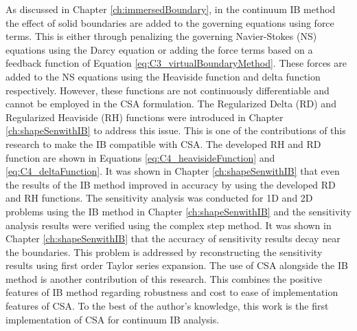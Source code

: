 As discussed in Chapter \ref{ch:immersedBoundary}, in the continuum IB method the effect of solid boundaries are added to the governing equations using force terms. This is either through penalizing the governing Navier-Stokes (NS) equations using the Darcy equation or adding the force terms based on a feedback function of Equation \eqref{eq:C3_virtualBoundaryMethod}. These forces are added to the NS equations using the Heaviside function and delta function respectively. However, these functions are not continuously differentiable and cannot be employed in the CSA formulation. The Regularized Delta (RD) and Regularized Heaviside (RH) functions were introduced in Chapter \ref{ch:shapeSenwithIB} to address this issue. This is one of the contributions of this research to make the IB compatible with CSA. The developed RH and RD function are shown in Equations \eqref{eq:C4_heavisideFunction} and \eqref{eq:C4_deltaFunction}. It was shown in Chapter \ref{ch:shapeSenwithIB} that even the results of the IB method improved in accuracy by using the developed RD and RH functions. The sensitivity analysis was conducted for 1D and 2D problems using the IB method in Chapter \ref{ch:shapeSenwithIB} and the sensitivity analysis results were verified using the complex step method. It was shown in Chapter \ref{ch:shapeSenwithIB} that the accuracy of sensitivity results decay near the boundaries. This problem is addressed by reconstructing the sensitivity results using first order Taylor series expansion. The use of CSA alongside the IB method is another contribution of this research. This combines the positive features of IB method regarding robustness and cost to ease of implementation features of CSA. To the best of the author's knowledge, this work is the first implementation of CSA for continuum IB analysis.
